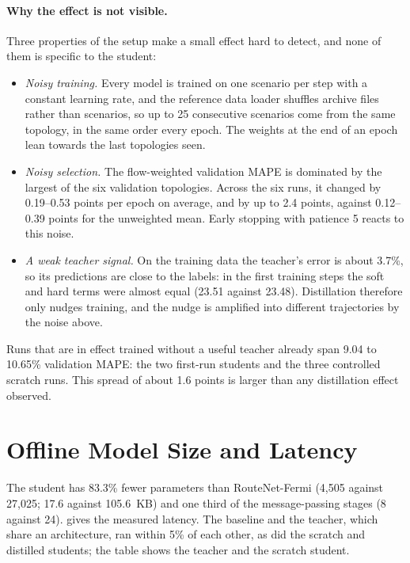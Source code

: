 \paragraph{Why the effect is not visible.} Three properties of the setup make a small effect hard to detect, and none of them is specific to the student:
\begin{itemize}
  \item \emph{Noisy training.} Every model is trained on one scenario per step with a constant learning rate, and the reference data loader shuffles archive files rather than scenarios, so up to 25 consecutive scenarios come from the same topology, in the same order every epoch. The weights at the end of an epoch lean towards the last topologies seen.
  \item \emph{Noisy selection.} The flow-weighted validation MAPE is dominated by the largest of the six validation topologies. Across the six runs, it changed by 0.19--0.53 points per epoch on average, and by up to 2.4 points, against 0.12--0.39 points for the unweighted mean. Early stopping with patience 5 reacts to this noise.
  \item \emph{A weak teacher signal.} On the training data the teacher's error is about 3.7\%, so its predictions are close to the labels: in the first training steps the soft and hard terms were almost equal (23.51 against 23.48). Distillation therefore only nudges training, and the nudge is amplified into different trajectories by the noise above.
\end{itemize}
Runs that are in effect trained without a useful teacher already span 9.04 to 10.65\% validation MAPE: the two first-run students and the three controlled scratch runs. This spread of about 1.6 points is larger than any distillation effect observed.

\section{Offline Model Size and Latency}
\label{sec:efficiency}

The student has 83.3\% fewer parameters than RouteNet-Fermi (4,505 against 27,025; 17.6 against 105.6~KB) and one third of the message-passing stages (8 against 24).  gives the measured latency. The baseline and the teacher, which share an architecture, ran within 5\% of each other, as did the scratch and distilled students; the table shows the teacher and the scratch student.

